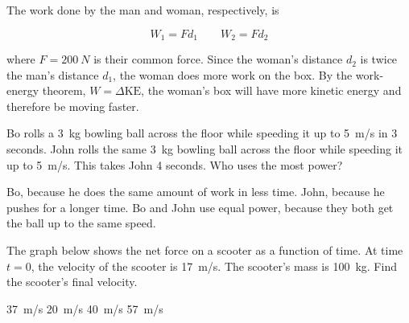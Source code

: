 \documentclass[answers]{exam}
\newif\ifversionKlevel
\begin{document}
\begin{questions}
\begin{solution}
The work done by the man and woman, respectively, is

\begin{equation*}
    W_1 = F d_1 \qquad W_2 = F d_2
\end{equation*}

where $F = \SI{200}{N}$ is their common force. Since the woman's distance $d_2$ is twice the man's distance $d_1$, the woman does more work on the box. By the work-energy theorem, $W = \Delta \text{KE}$, the woman's box will have more kinetic energy and therefore be moving faster. 
    
\end{solution}

\question
Bo rolls a \SI{3}{kg} bowling ball across the floor while speeding it up to \SI{5}{m/s} in 3 seconds. John rolls the same \SI{3}{kg} bowling ball across the floor while speeding it up to \SI{5}{m/s}. This takes John 4 seconds.  Who uses the most power?

\begin{randomizechoices}[norandomize]
    \correctchoice Bo, because he does the same amount of work in less time. 
    \choice John, because he pushes for a longer time.
    \choice Bo and John use equal power, because they both get the ball up to the same speed.
\end{randomizechoices}




\ifversionKlevel
\question
The graph below shows the net force on a scooter as a function of time. At time $t=0$, the velocity of the scooter is \SI{17}{m/s}. The scooter's mass is \SI{100}{kg}. Find the scooter's final velocity.

\begin{center}
\end{center}

\begin{randomizeoneparchoices}
    \correctchoice \SI{37}{m/s}
    \choice \SI{20}{m/s}
    \choice \SI{40}{m/s}
    \choice \SI{57}{m/s}
\end{randomizeoneparchoices}


\end{questions}
\end{document}
